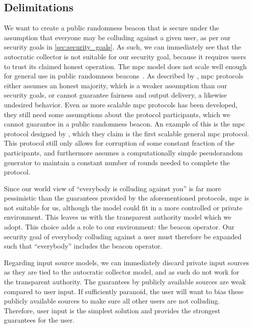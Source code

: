 \subsection{Delimitations}%
\label{sub:delimitations}
We want to create a public randomness beacon that is secure under the assumption that everyone may be colluding against a given user, as per our security goals in \cref{sec:security_goals}.
As such, we can immediately see that the autocratic collector is not suitable for our security goal, because it requires users to trust its claimed honest operation.
The \gls{mpc} model does not scale well enough for general use in public randomness beacons~\cite{syta2017scalable}.
As described by \citet{damgaard2006scalable}, \gls{mpc} protocols either assumes an honest majority, which is a weaker assumption than our security goals, or cannot guarantee fairness and output delivery, a likewise undesired behavior.
Even as more scalable \gls{mpc} protocols has been developed, they still need some assumptions about the protocol participants, which we cannot guarantee in a public randomness beacon.
An example of this is the \gls{mpc} protocol designed by \citet{damgaard2006scalable}, which they claim is the first scalable general \gls{mpc} protocol.
This protocol still only allows for corruption of some constant fraction of the participants, and furthermore assumes a computationally simple pseudorandom generator to maintain a constant number of rounds needed to complete the protocol.

Since our world view of \enquote{everybody is colluding against you} is far more pessimistic than the guarantees provided by the aforementioned protocols, \gls{mpc} is not suitable for us, although the model could fit in a more controlled or private environment.
This leaves us with the transparent authority model which we adopt.
This choice adds a role to our environment: the beacon operator.
Our security goal of everybody colluding against a user must therefore be expanded such that \enquote{everybody} includes the beacon operator.

Regarding input source models, we can immediately discard private input sources as they are tied to the autocratic collector model, and as such do not work for the transparent authority.
The guarantees by publicly available sources are weak compared to user input.
If sufficiently paranoid, the user will want to bias these publicly available sources to make sure all other users are not colluding.
Therefore, user input is the simplest solution and provides the strongest guarantees for the user.

